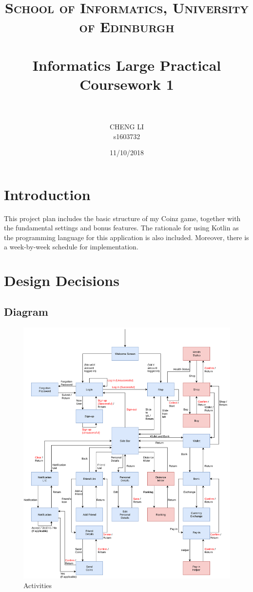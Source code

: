 \documentclass[paper=a4, fontsize=11pt]{scrartcl} %
\title{
	\normalfont \normalsize 
	\textsc{School of Informatics, University of Edinburgh} \\ [25pt] %
	\horrule{0.5pt} \\[0.4cm] %
	\huge Informatics Large Practical Coursework 1 \\ %
	\horrule{2pt} \\[0.5cm] %
}
\author{CHENG LI \\ s1603732}
\date{11/10/2018}
\begin{document}
\maketitle

\section{Introduction}
\paragraph{} This project plan includes the basic structure of my Coinz game, together with the fundamental settings and bonus features. The rationale for using Kotlin as the programming language for this application is also included. Moreover, there is a week-by-week schedule for implementation.

\section{Design Decisions}
\subsection{Diagram}
\begin{figure}
	\includegraphics[width=\linewidth]{Coinz.png}
	\caption{Activities}
\end{figure}
\end{document}
